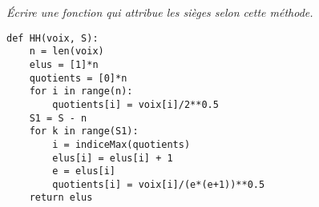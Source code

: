 \begin{Exercise}\it
Écrire une fonction  qui attribue les sièges selon cette méthode.
\end{Exercise}
\begin{Answer}
\begin{lstlisting}
def HH(voix, S):
    n = len(voix)
    elus = [1]*n
    quotients = [0]*n
    for i in range(n):
        quotients[i] = voix[i]/2**0.5
    S1 = S - n
    for k in range(S1):
        i = indiceMax(quotients)
        elus[i] = elus[i] + 1
        e = elus[i]
        quotients[i] = voix[i]/(e*(e+1))**0.5
    return elus
\end{lstlisting}
\end{Answer}




